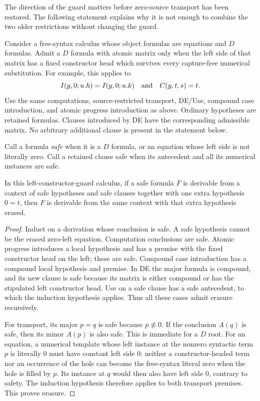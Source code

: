 The direction of the guard matters before zero-source transport has
been restored. The following statement explains why it is not enough
to combine the two older restrictions without changing the guard.

Consider a free-syntax calculus whose object formulas are equations and
$D$ formulas. Admit a $D$ formula with atomic matrix only when the left
side of that matrix has a fixed constructor head which survives every
capture-free numerical substitution. For example, this applies to
\[
 I(y,0;u.h)=I(y,0;u.k)
 \quad\hbox{and}\quad
 C(y,t,s)=t.
\]
Use the same computations, source-restricted transport, DE/Use,
compound case introduction, and atomic progress introduction as above.
Ordinary hypotheses are retained formulas. Clauses introduced by DE
have the corresponding admissible matrix. No arbitrary additional
clause is present in the statement below.

Call a formula \emph{safe} when it is a $D$ formula, or an equation
whose left side is not literally zero. Call a retained clause safe when
its antecedent and all its numerical instances are safe.

\begin{proposition}
\label{compat:inert-zero}
In this left-constructor-guard calculus, if a safe formula $F$ is
derivable from a context of safe hypotheses and safe clauses together
with one extra hypothesis $0=t$, then $F$ is derivable from the same
context with that extra hypothesis erased.
\end{proposition}
\begin{proof}
Induct on a derivation whose conclusion is safe. A safe hypothesis
cannot be the erased zero-left equation. Computation conclusions are
safe. Atomic progress introduces a local hypothesis and has a premise
with the fixed constructor head on the left; these are safe. Compound
case introduction has a compound local hypothesis and premise. In DE
the major formula is compound, and its new clause is safe because its
matrix is either compound or has the stipulated left constructor head.
Use on a safe clause has a safe antecedent, to which the induction
hypothesis applies. Thus all these cases admit erasure recursively.

For transport, its major $p=q$ is safe because $p\not\equiv0$.
If the conclusion $A(q)$ is safe, then its minor $A(p)$ is also safe.
This is immediate for a $D$ root. For an equation, a numerical template
whose left instance at the nonzero syntactic term $p$ is literally $0$
must have constant left side $0$: neither a constructor-headed term
nor an occurrence of the hole can become the free-syntax literal zero
when the hole is filled by $p$. Its instance at $q$ would then also
have left side $0$, contrary to safety. The induction hypothesis
therefore applies to both transport premises. This proves erasure.
\end{proof}

